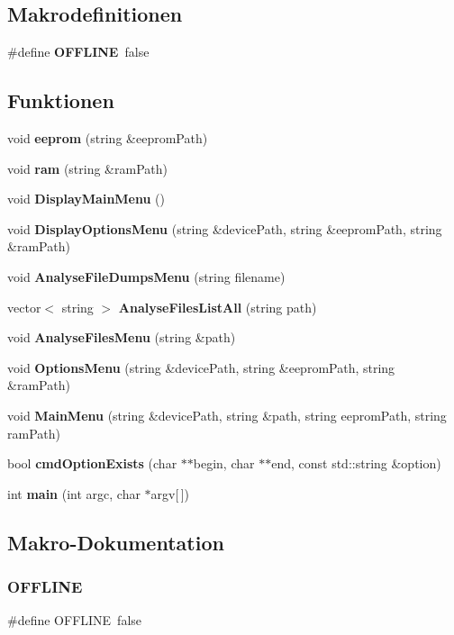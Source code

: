 \subsection*{Makrodefinitionen}
\begin{DoxyCompactItemize}
\item 
\#define \textbf{ O\+F\+F\+L\+I\+NE}~false
\end{DoxyCompactItemize}
\subsection*{Funktionen}
\begin{DoxyCompactItemize}
\item 
void \textbf{ eeprom} (string \&eeprom\+Path)
\item 
void \textbf{ ram} (string \&ram\+Path)
\item 
void \textbf{ Display\+Main\+Menu} ()
\item 
void \textbf{ Display\+Options\+Menu} (string \&device\+Path, string \&eeprom\+Path, string \&ram\+Path)
\item 
void \textbf{ Analyse\+File\+Dumps\+Menu} (string filename)
\item 
vector$<$ string $>$ \textbf{ Analyse\+Files\+List\+All} (string path)
\item 
void \textbf{ Analyse\+Files\+Menu} (string \&path)
\item 
void \textbf{ Options\+Menu} (string \&device\+Path, string \&eeprom\+Path, string \&ram\+Path)
\item 
void \textbf{ Main\+Menu} (string \&device\+Path, string \&path, string eeprom\+Path, string ram\+Path)
\item 
bool \textbf{ cmd\+Option\+Exists} (char $\ast$$\ast$begin, char $\ast$$\ast$end, const std\+::string \&option)
\item 
int \textbf{ main} (int argc, char $\ast$argv[$\,$])
\end{DoxyCompactItemize}


\subsection{Makro-\/\+Dokumentation}
\mbox{\label{_jura_coffee_memory_8cpp_a9fc595816a36e47d2b583afa775b3d4c}} 
\subsubsection{O\+F\+F\+L\+I\+NE}
{\footnotesize\ttfamily \#define O\+F\+F\+L\+I\+NE~false}



